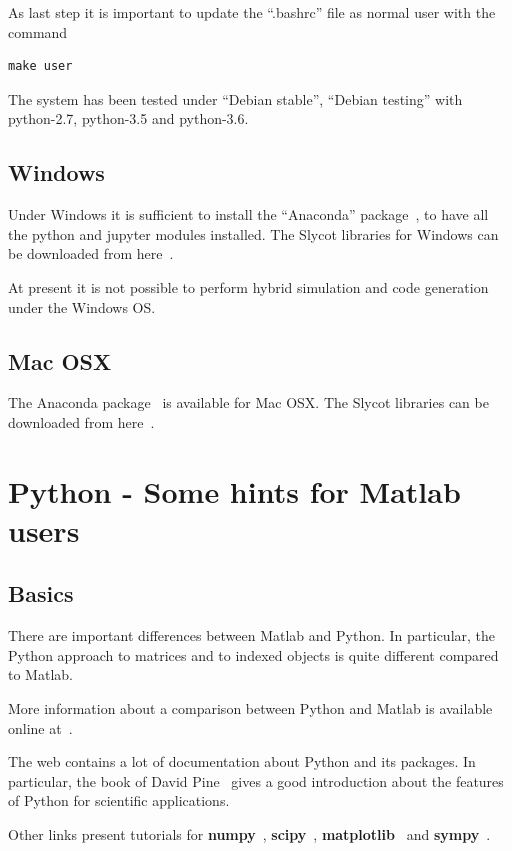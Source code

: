 As last step it is important to update the ``.bashrc'' file as normal user with 
the command

\begin{verbatim}
make user
\end{verbatim}

The system has been tested under ``Debian stable'', ``Debian testing'' with 
python-2.7, python-3.5 and python-3.6.

\section{Windows}

Under Windows it is sufficient to install the ``Anaconda'' 
package~\cite{ANACONDA}, to have all the python and jupyter modules installed.
The Slycot libraries for Windows can be downloaded from here~\cite{SLYCOT2}.

At present it is not possible to perform hybrid simulation and code generation 
under the Windows OS.

\section{Mac OSX}

The Anaconda package~\cite{ANACONDA} is available for Mac OSX. The Slycot 
libraries can be downloaded from here~\cite{SLYCOT2}.

\chapter{Python - Some hints for Matlab users}

\section{Basics}
There are important differences between Matlab and Python.
In particular, the Python approach to matrices and to indexed objects is 
quite different compared to Matlab.

More information about a comparison between Python and Matlab is available 
online at~\cite{PYTHONVSMATLAB}.

The web contains a lot of documentation about Python and its packages.
In particular, the book of David Pine~\cite{PYMAN} gives a good introduction 
about the features of Python for scientific applications.

Other links present tutorials for \textbf{numpy}~\cite{NUMPY},
\textbf{scipy}~\cite{SCIPY}, \textbf{matplotlib}~\cite{MATPLOTLIB} and 
\textbf{sympy}~\cite{SYMPY}.

